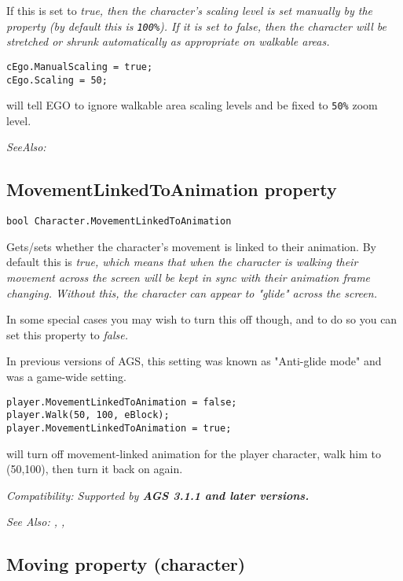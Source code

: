 If this is set to \it{true}, then the character's scaling level is set manually by the
 property (by default this is \verb$100%$).
If it is set to \it{false}, then the character will be stretched or shrunk
automatically as appropriate on walkable areas.

\begin{verbatim}
cEgo.ManualScaling = true;
cEgo.Scaling = 50;
\end{verbatim}
will tell EGO to ignore walkable area scaling levels and be fixed to \verb$50%$ zoom level.

\it{SeeAlso:} 


\subsection{MovementLinkedToAnimation property}\label{Character.MovementLinkedToAnimation}%

\begin{verbatim}
bool Character.MovementLinkedToAnimation
\end{verbatim}
Gets/sets whether the character's movement is linked to their animation. By default
this is \it{true}, which means that when the character is walking their movement across
the screen will be kept in sync with their animation frame changing. Without this, the
character can appear to "glide" across the screen.

In some special cases you may wish to turn this off though, and to do so you can set this
property to \it{false}.

In previous versions of AGS, this setting was known as "Anti-glide mode" and was a game-wide
setting.

\begin{verbatim}
player.MovementLinkedToAnimation = false;
player.Walk(50, 100, eBlock);
player.MovementLinkedToAnimation = true;
\end{verbatim}
will turn off movement-linked animation for the player character, walk him to (50,100),
then turn it back on again.

\it{Compatibility:} Supported by \bf{AGS 3.1.1} and later versions.

\it{See Also:}
,
,


\subsection{Moving property (character)}\label{Character.Moving}%

